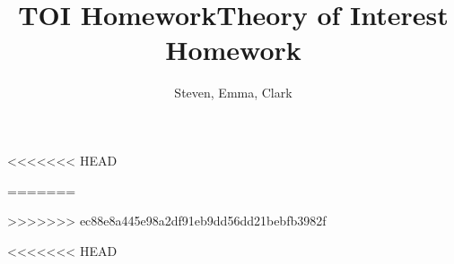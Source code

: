 \documentclass[12pt]{article}
\newenvironment{theorem}[2][Theorem]{\begin{trivlist}
\item[\hskip \labelsep {\bfseries #1}\hskip \labelsep {\bfseries #2.}]}{\end{trivlist}}
\newenvironment{lemma}[2][Lemma]{\begin{trivlist}
\item[\hskip \labelsep {\bfseries #1}\hskip \labelsep {\bfseries #2.}]}{\end{trivlist}}
\newenvironment{exercise}[2][Exercise]{\begin{trivlist}
\item[\hskip \labelsep {\bfseries #1}\hskip \labelsep {\bfseries #2.}]}{\end{trivlist}}
\newenvironment{problem}[2][Problem]{\begin{trivlist}
\item[\hskip \labelsep {\bfseries #1}\hskip \labelsep {\bfseries #2.}]}{\end{trivlist}}
\newenvironment{question}[2][Question]{\begin{trivlist}
\item[\hskip \labelsep {\bfseries #1}\hskip \labelsep {\bfseries #2.}]}{\end{trivlist}}
\newenvironment{corollary}[2][Corollary]{\begin{trivlist}
\item[\hskip \labelsep {\bfseries #1}\hskip \labelsep {\bfseries #2.}]}{\end{trivlist}}
\begin{document}
 
 
<<<<<<< HEAD
\title{TOI Homework}%
=======
\title{Theory of Interest Homework}%
>>>>>>> ec88e8a445e98a2df91eb9dd56dd21bebfb3982f
\author{Steven, Emma, Clark\\ %
}%
\maketitle

<<<<<<< HEAD
\end{document}
